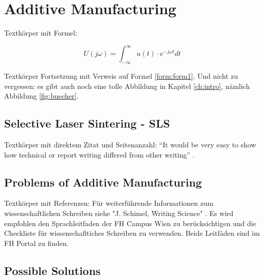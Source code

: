 \section{Additive Manufacturing}
\label{sec:additive-manufacturing}

Textkörper mit Formel:

\begin{equation}
    U(j\omega)=\int^{\infty}_{-\infty}{u(t) \cdot e^{-j\omega t}dt}
    \label{form:form1}
\end{equation}

Textkörper Fortsetzung mit Verweis auf Formel \ref{form:form1}. Und nicht zu vergessen: es gibt auch noch eine tolle Abbildung in Kapitel \ref{ch:intro}, nämlich Abbildung \ref{fig:buecher}.

\subsection{Selective Laser Sintering - SLS}
\label{subsec:selective-laser-sintering---sls}

Textkörper mit direktem Zitat und Seitenanzahl:
``It would be very easy to show how technical or report writing differed from other writing'' \cite[p.~3]{young2002technical}.

\subsection{Problems of Additive Manufacturing}
\label{subsec:problems-of-additive-manufacturing}

Textkörper mit Referenzen:
Für weiterführende Informationen zum wissenschaftlichen Schreiben siehe "J. Schimel, Writing Science" \cite{schimel2012writing}. Es wird empfohlen den Sprachleitfaden der FH Campus Wien \cite{alker2006} zu berücksichtigen und die Checkliste für wissenschafltiches Schreiben \cite{petz2018} zu verwenden. Beide Leitfäden sind im FH Portal zu finden.

\subsection{Possible Solutions}
\label{subsec:possible-solutions}
